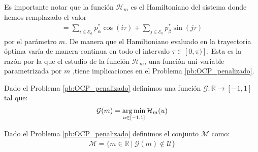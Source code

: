 Es importante notar que la función $\mathcal{H}_m$ es el Hamiltoniano del sistema donde hemos remplazado el valor 
\begin{gather}
	[\bm{p}^* \cdot \bm{\mathcal{D}}(\tau)] = \sum_{i \in \mathcal{E}_a} p^*_\alpha \cos(i\tau) + \sum_{j \in \mathcal{E}_b} p^*_\beta \sin(j\tau) 
\end{gather}
por el parámetro $m$. De manera que el Hamiltoniano evaluado en la trayectoria óptima varía de manera continua en todo el intervalo $\tau \in [0,\pi)]$. 
%
Esta es la razón por la que el estudio de la función $\mathcal{H}_m$, una función uni-variable parametrizada por $m$ ,tiene implicaciones en el Problema \ref{pb:OCP_penalizado}.
\newline

\begin{definition}
    Dado el Problema \ref{pb:OCP_penalizado}  definimos una función $\mathcal{G}:\mathbb{R} \rightarrow [-1,1]$ tal que:
    \begin{gather}
        \mathcal{G}(m) = \operatorname*{arg\,min}_{u \in [-1,1]} \mathcal{H}_m(u)
    \end{gather}
\end{definition}
\begin{definition}
    Dado el Problema \ref{pb:OCP_penalizado} definimos el conjunto $\mathcal{M}$ como:
    \begin{gather}
        \mathcal{M} = \{m \in \mathbb{R}\ | \ \mathcal{G}(m) \notin \mathcal{U} \}
    \end{gather}
\end{definition}



